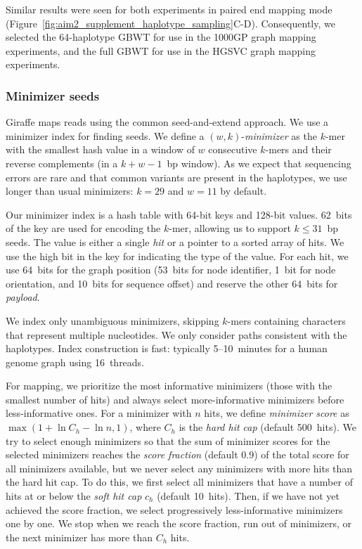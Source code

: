 \documentclass[11pt]{ucscthesis}
\newcommand{\param}[1]{\emph{#1}}
\newcommand{\vocab}[1]{\emph{#1}}
\begin{document}
Similar results were seen for both experiments in paired end mapping mode (Figure~\ref{fig:aim2_supplement_haplotype_sampling}C-D). Consequently, we selected the 64-haplotype GBWT for use in the 1000GP graph mapping experiments, and the full GBWT for use in the HGSVC graph mapping experiments.


\subsubsection{Minimizer seeds}
\label{subsec:minimizers}
Giraffe maps reads using the common seed-and-extend approach.
We use a minimizer index\cite{Roberts2004} for finding seeds.
We define a $(w,k)$-\vocab{minimizer} as the $k$-mer with the smallest hash value in a window of $w$ consecutive $k$-mers and their reverse complements (in a $k+w-1$~bp window).
As we expect that sequencing errors are rare and that common variants are present in the haplotypes, we use longer than usual minimizers: $k = 29$ and $w = 11$ by default.

Our minimizer index is a hash table with 64-bit keys and 128-bit values.
62~bits of the key are used for encoding the $k$-mer, allowing us to support $k \le 31$~bp seeds.
The value is either a single \vocab{hit} or a pointer to a sorted array of hits.
We use the high bit in the key for indicating the type of the value.
For each hit, we use 64~bits for the graph position (53~bits for node identifier, 1~bit for node orientation, and 10~bits for sequence offset) and reserve the other 64~bits for \vocab{payload}.

We index only unambiguous minimizers, skipping $k$-mers containing characters that represent multiple nucleotides.
We only consider paths consistent with the haplotypes.
Index construction is fast: typically 5--10~minutes for a human genome graph using 16~threads.

For mapping, we prioritize the most informative minimizers (those with the smallest number of hits) and always select more-informative minimizers before less-informative ones.
For a minimizer with $n$ hits, we define \vocab{minimizer score} as $\max\left(1 + \ln C_h - \ln n, 1\right)$, where $C_h$ is the \param{hard hit cap} (default 500~hits).
We try to select enough minimizers so that the sum of minimizer scores for the selected minimizers reaches the \param{score fraction} (default 0.9) of the total score for all minimizers available, but we never select any minimizers with more hits than the hard hit cap.
To do this, we first select all minimizers that have a number of hits at or below the \param{soft hit cap} $c_h$ (default 10~hits).
Then, if we have not yet achieved the score fraction, we select progressively less-informative minimizers one by one. We stop when we reach the score fraction, run out of minimizers, or the next minimizer has more than $C_h$ hits.
\end{document}
